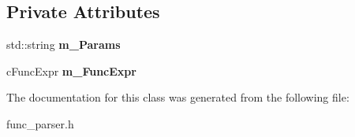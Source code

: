 \subsection*{Private Attributes}
\begin{DoxyCompactItemize}
\item 
\hypertarget{classengine_1_1cFuncExprParser_adf40d1c1564f6ca3144da0f840ac3b4e}{std\-::string {\bfseries m\-\_\-\-Params}}\label{classengine_1_1cFuncExprParser_adf40d1c1564f6ca3144da0f840ac3b4e}

\item 
\hypertarget{classengine_1_1cFuncExprParser_a0f472bca85131d0b02073d738a525f2a}{c\-Func\-Expr {\bfseries m\-\_\-\-Func\-Expr}}\label{classengine_1_1cFuncExprParser_a0f472bca85131d0b02073d738a525f2a}

\end{DoxyCompactItemize}


The documentation for this class was generated from the following file\-:\begin{DoxyCompactItemize}
\item 
func\-\_\-parser.\-h\end{DoxyCompactItemize}
